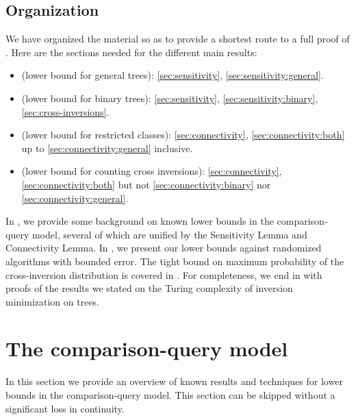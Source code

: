 \documentclass{toc}
\begin{document}
\subsection{Organization} 
%
We have organized the material so as to provide a shortest route to a full proof of . Here are the sections needed for the different main results:
\begin{itemize}
\item {} (lower bound for general trees): \ref{sec:sensitivity}, \ref{sec:sensitivity:general}.
\item {} (lower bound for binary trees):  \ref{sec:sensitivity}, \ref{sec:sensitivity:binary}, \ref{sec:cross-inversions}.
\item {} (lower bound for restricted classes): \ref{sec:connectivity}, \ref{sec:connectivity:both} up to \ref{sec:connectivity:general} inclusive.
\item {} (lower bound for counting cross inversions): \ref{sec:connectivity}, \ref{sec:connectivity:both} but not \ref{sec:connectivity:binary} nor \ref{sec:connectivity:general}.
\end{itemize}
In , we provide some background on known lower bounds in the comparison-query model, several of which are unified by the Sensitivity Lemma and Connectivity Lemma. In , we present our lower bounds against randomized algorithms with bounded error. The tight bound on maximum probability of the cross-inversion distribution is covered in . For completeness, we end in  with proofs of the results we stated on the Turing complexity of inversion minimization on trees.



\section{The comparison-query model}
\label{sec:model}
%

In this section we provide an overview of known results and techniques for lower bounds in the comparison-query model. This section can be skipped without a significant loss in continuity.
\end{document}

